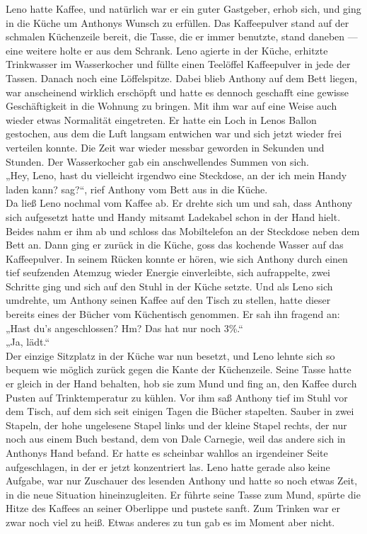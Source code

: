 \documentclass[ngerman,smalldemyvopaper,11pt,oneside,onecolumn,openright,extrafontsizes]{memoir}
\begin{document}
Leno hatte Kaffee, und natürlich war er ein guter Gastgeber, erhob sich, und ging in die Küche um Anthonys Wunsch zu erfüllen. Das Kaffeepulver stand auf der schmalen Küchenzeile bereit, die Tasse, die er immer benutzte, stand daneben — eine weitere holte er aus dem Schrank. Leno agierte in der Küche, erhitzte Trinkwasser im Wasserkocher und füllte einen Teelöffel Kaffeepulver in jede der Tassen. Danach noch eine Löffelspitze. Dabei blieb Anthony auf dem Bett liegen, war anscheinend wirklich erschöpft und hatte es dennoch geschafft eine gewisse Geschäftigkeit in die Wohnung zu bringen. Mit ihm war auf eine Weise auch wieder etwas Normalität eingetreten. Er hatte ein Loch in Lenos Ballon gestochen, aus dem die Luft langsam entwichen war und sich jetzt wieder frei verteilen konnte. Die Zeit war wieder messbar geworden in Sekunden und Stunden. Der Wasserkocher gab ein anschwellendes Summen von sich.
\vspace{0.5em} \\
„Hey, Leno, hast du vielleicht irgendwo eine Steckdose, an der ich mein Handy laden kann? sag?“, rief Anthony vom Bett aus in die Küche.
\vspace{0.5em} \\
Da ließ Leno nochmal vom Kaffee ab. Er drehte sich um und sah, dass Anthony sich aufgesetzt hatte und Handy mitsamt Ladekabel schon in der Hand hielt. Beides nahm er ihm ab und schloss das Mobiltelefon an der Steckdose neben dem Bett an. Dann ging er zurück in die Küche, goss das kochende Wasser auf das Kaffeepulver. In seinem Rücken konnte er hören, wie sich Anthony durch einen tief seufzenden Atemzug wieder Energie einverleibte, sich aufrappelte, zwei Schritte ging und sich auf den Stuhl in der Küche setzte. Und als Leno sich umdrehte, um Anthony seinen Kaffee auf den Tisch zu stellen, hatte dieser bereits eines der Bücher vom Küchentisch genommen. Er sah ihn fragend an:
\vspace{0.5em} \\
„Hast du's angeschlossen? Hm? Das hat nur noch 3\%.“
\vspace{0.5em} \\
„Ja, lädt.“
\vspace{0.5em} \\
Der einzige Sitzplatz in der Küche war nun besetzt, und Leno lehnte sich so bequem wie möglich zurück gegen die Kante der Küchenzeile. Seine Tasse hatte er gleich in der Hand behalten, hob sie zum Mund und fing an, den Kaffee durch Pusten auf Trinktemperatur zu kühlen. Vor ihm saß Anthony tief im Stuhl vor dem Tisch, auf dem sich seit einigen Tagen die Bücher stapelten. Sauber in zwei Stapeln, der hohe ungelesene Stapel links und der kleine Stapel rechts, der nur noch aus einem Buch bestand, dem von Dale Carnegie, weil das andere sich in Anthonys Hand befand. Er hatte es scheinbar wahllos an irgendeiner Seite aufgeschlagen, in der er jetzt konzentriert las. Leno hatte gerade also keine Aufgabe, war nur Zuschauer des lesenden Anthony und hatte so noch etwas Zeit, in die neue Situation hineinzugleiten. Er führte seine Tasse zum Mund, spürte die Hitze des Kaffees an seiner Oberlippe und pustete sanft. Zum Trinken war er zwar noch viel zu heiß. Etwas anderes zu tun gab es im Moment aber nicht.\\
\end{document}
